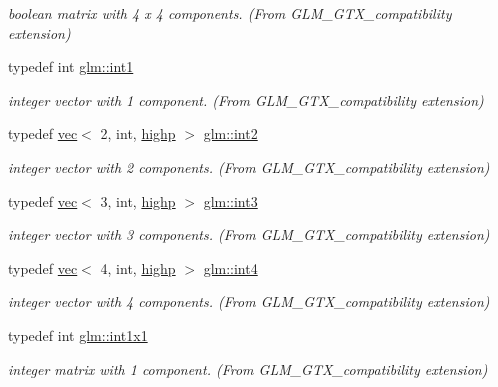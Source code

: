 \begin{DoxyCompactItemize}
\begin{DoxyCompactList}\small\item\em boolean matrix with 4 x 4 components. (From G\+L\+M\+\_\+\+G\+T\+X\+\_\+compatibility extension) \end{DoxyCompactList}\item 
typedef int \mbox{\hyperlink{group__gtx__compatibility_gaba41d7803e4b24c17656d74377b88286}{glm\+::int1}}
\begin{DoxyCompactList}\small\item\em integer vector with 1 component. (From G\+L\+M\+\_\+\+G\+T\+X\+\_\+compatibility extension) \end{DoxyCompactList}\item 
typedef \mbox{\hyperlink{structglm_1_1vec}{vec}}$<$ 2, int, \mbox{\hyperlink{namespaceglm_a36ed105b07c7746804d7fdc7cc90ff25ac6f7eab42eacbb10d59a58e95e362074}{highp}} $>$ \mbox{\hyperlink{group__gtx__compatibility_ga3a3a6007d7619dee4f6c425fe7ac24eb}{glm\+::int2}}
\begin{DoxyCompactList}\small\item\em integer vector with 2 components. (From G\+L\+M\+\_\+\+G\+T\+X\+\_\+compatibility extension) \end{DoxyCompactList}\item 
typedef \mbox{\hyperlink{structglm_1_1vec}{vec}}$<$ 3, int, \mbox{\hyperlink{namespaceglm_a36ed105b07c7746804d7fdc7cc90ff25ac6f7eab42eacbb10d59a58e95e362074}{highp}} $>$ \mbox{\hyperlink{group__gtx__compatibility_ga90dda63e632aac169a8796ac06ff9de2}{glm\+::int3}}
\begin{DoxyCompactList}\small\item\em integer vector with 3 components. (From G\+L\+M\+\_\+\+G\+T\+X\+\_\+compatibility extension) \end{DoxyCompactList}\item 
typedef \mbox{\hyperlink{structglm_1_1vec}{vec}}$<$ 4, int, \mbox{\hyperlink{namespaceglm_a36ed105b07c7746804d7fdc7cc90ff25ac6f7eab42eacbb10d59a58e95e362074}{highp}} $>$ \mbox{\hyperlink{group__gtx__compatibility_ga19f0c43f626567ad3ca888b8ad0d0093}{glm\+::int4}}
\begin{DoxyCompactList}\small\item\em integer vector with 4 components. (From G\+L\+M\+\_\+\+G\+T\+X\+\_\+compatibility extension) \end{DoxyCompactList}\item 
typedef int \mbox{\hyperlink{group__gtx__compatibility_ga09016a637a3cd093c22e6188080ac750}{glm\+::int1x1}}
\begin{DoxyCompactList}\small\item\em integer matrix with 1 component. (From G\+L\+M\+\_\+\+G\+T\+X\+\_\+compatibility extension) \end{DoxyCompactList}\item 

\end{DoxyCompactItemize}

